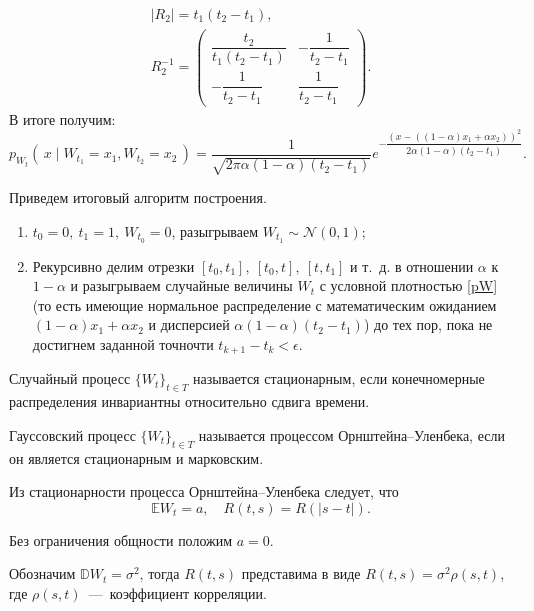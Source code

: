 \begin{enumerate}
\begin{gather*}
	|R_2|=t_1(t_2-t_1), \\
	R_2^{-1}=\begin{pmatrix}
	\dfrac{t_2}{t_1(t_2-t_1)} & -\dfrac{1}{t_2-t_1} \\
	-\dfrac{1}{t_2-t_1} & \dfrac{1}{t_2-t_1}
	\end{pmatrix}.
	\end{gather*}
	В итоге получим:
	\begin{equation}\label{pW}
	    p_{W_t}(\,x \mid W_{t_1} = x_1, W_{t_2} = x_2\,) = \dfrac{1}{\sqrt{2 
         \pi \alpha (1 - \alpha)(t_2 - t_1)}} e^{-\dfrac{\left(x - ((1 - \alpha)
         x_1 + \alpha x_2) \right)^2}{2 \alpha(1 - \alpha)(t_2-t_1)}}. 
	\end{equation}
\end{enumerate}
Приведем итоговый алгоритм построения. 
\begin{enumerate}
	\item $t_0 = 0,\ t_1=1,\ W_{t_0}=0$, разыгрываем $W_{t_1} \sim 
     \mathcal{N}(0,1)$;
	\item Рекурсивно делим отрезки $[t_0,t_1],\ [t_0,t],\ [t,t_1]$ и т.~д. 
     в отношении $ \alpha $ к $ 1 - \alpha $ и разыгрываем случайные 
     величины $W_t$ с условной плотностью \eqref{pW} (то есть имеющие 
     нормальное распределение с математическим ожиданием $(1 - \alpha) 
     x_1 + \alpha x_2 $ и дисперсией $ \alpha(1 - \alpha)(t_2 - t_1)$) до 
     тех пор, пока не достигнем заданной точночти $t_{k + 1} - t_k < \epsilon$.
\end{enumerate}


\begin{definition}
	Случайный процесс \( \lbrace W_t\rbrace_{t\in T} \) называется 
     стационарным, если конечномерные распределения инвариантны 
     относительно сдвига времени.
\end{definition}

\begin{definition}
	Гауссовский процесс \( \lbrace W_t\rbrace_{t\in T} \) называется 
     процессом Орнштейна--Уленбека, если он является стационарным и 
     марковским.
\end{definition}

Из стационарности процесса Орнштейна--Уленбека следует, что
\[
\mathbb{E}W_t=a,\quad R(t,s)=R(|s-t|).
\]

Без ограничения общности положим \( a=0 \).

Обозначим \( \mathbb{D}W_t=\sigma^2 \), тогда \( R(t,s) \) представима в 
 виде \( R(t,s)=\sigma^2\rho(s,t) \), где \( \rho(s,t) \)~---~коэффициент 
 корреляции.

